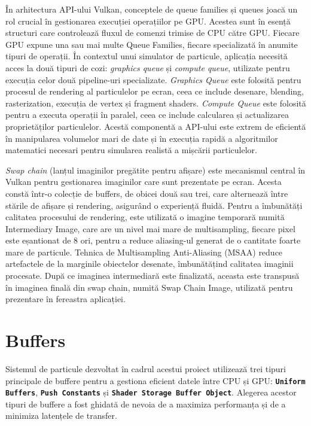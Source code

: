 În arhitectura API-ului Vulkan, conceptele de queue families și queues joacă un rol crucial în gestionarea execuției operațiilor pe GPU. Acestea sunt în esență structuri care controlează fluxul de comenzi trimise de CPU către GPU. Fiecare GPU expune una sau mai multe Queue Families, fiecare specializată în anumite tipuri de operații. În contextul unui simulator de particule, aplicația necesită acces la două tipuri de cozi: \textit{graphics queue} și \textit{compute queue}, utilizate pentru execuția celor două pipeline-uri specializate. \textit{Graphics Queue} este folosită pentru procesul de rendering al particulelor pe ecran, ceea ce include desenare, blending, rasterization, execuția de vertex și fragment shaders. \textit{Compute Queue} este folosită pentru a executa operații în paralel, ceea ce include calcularea și actualizarea proprietăților particulelor. Acestă componentă a API-ului este extrem de eficientă în manipularea volumelor mari de date și în execuția rapidă a algoritmilor matematici necesari pentru simularea realistă a mișcării particulelor. 

\textit{Swap chain} (lanțul imaginilor pregătite pentru afișare) este mecanismul central în Vulkan pentru gestionarea imaginilor care sunt prezentate pe ecran. Acesta constă într-o colecție de buffers, de obicei două sau trei, care alternează între stările de afișare și rendering, asigurând o experiență fluidă. Pentru a îmbunătăți calitatea procesului de rendering, este utilizată o imagine temporară numită Intermediary Image, care are un nivel mai mare de multisampling, fiecare pixel este eșantionat de 8 ori, pentru a reduce aliasing-ul generat de o cantitate foarte mare de particule. Tehnica de Multisampling Anti-Aliasing \cite{MSAA_citation} (MSAA) reduce artefactele de la marginile obiectelor desenate, îmbunătățind calitatea imaginii procesate. După ce imaginea intermediară este finalizată, aceasta este transpusă în imaginea finală din swap chain, numită Swap Chain Image, utilizată pentru prezentare în fereastra aplicației. 

\section{Buffers}
Sistemul de particule dezvoltat în cadrul acestui proiect utilizează trei tipuri principale de buffere pentru a gestiona eficient datele între CPU și GPU: \textbf{\texttt{Uniform Buffers}}, \textbf{\texttt{Push Constants}} și \textbf{\texttt{Shader Storage Buffer Object}}. Alegerea acestor tipuri de buffere a fost ghidată de nevoia de a maximiza performanța și de a minimiza latențele de transfer. 

